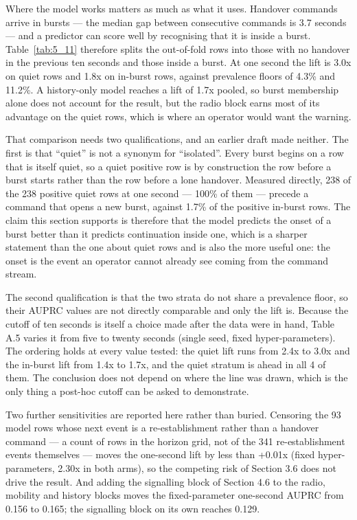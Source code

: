 Where the model works matters as much as what it uses. Handover commands arrive in bursts --- the median gap between consecutive commands is 3.7 seconds --- and a predictor can score well by recognising that it is inside a burst. Table~\ref{tab:5_11} therefore splits the out-of-fold rows into those with no handover in the previous ten seconds and those inside a burst. At one second the lift is 3.0x on quiet rows and 1.8x on in-burst rows, against prevalence floors of 4.3\% and 11.2\%. A history-only model reaches a lift of 1.7x pooled, so burst membership alone does not account for the result, but the radio block earns most of its advantage on the quiet rows, which is where an operator would want the warning.

That comparison needs two qualifications, and an earlier draft made neither. The first is that ``quiet'' is not a synonym for ``isolated''. Every burst begins on a row that is itself quiet, so a quiet positive row is by construction the row before a burst starts rather than the row before a lone handover. Measured directly, 238 of the 238 positive quiet rows at one second --- 100\% of them --- precede a command that opens a new burst, against 1.7\% of the positive in-burst rows. The claim this section supports is therefore that the model predicts the onset of a burst better than it predicts continuation inside one, which is a sharper statement than the one about quiet rows and is also the more useful one: the onset is the event an operator cannot already see coming from the command stream.

The second qualification is that the two strata do not share a prevalence floor, so their AUPRC values are not directly comparable and only the lift is. Because the cutoff of ten seconds is itself a choice made after the data were in hand, Table A.5 varies it from five to twenty seconds (single seed, fixed hyper-parameters). The ordering holds at every value tested: the quiet lift runs from 2.4x to 3.0x and the in-burst lift from 1.4x to 1.7x, and the quiet stratum is ahead in all 4 of them. The conclusion does not depend on where the line was drawn, which is the only thing a post-hoc cutoff can be asked to demonstrate.

Two further sensitivities are reported here rather than buried. Censoring the 93 model rows whose next event is a re-establishment rather than a handover command --- a count of rows in the horizon grid, not of the 341 re-establishment events themselves --- moves the one-second lift by less than +0.01x (fixed hyper-parameters, 2.30x in both arms), so the competing risk of Section 3.6 does not drive the result. And adding the signalling block of Section 4.6 to the radio, mobility and history blocks moves the fixed-parameter one-second AUPRC from 0.156 to 0.165; the signalling block on its own reaches 0.129.


